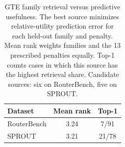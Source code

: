 \begin{table}[H]
\centering
\small
\setlength{\tabcolsep}{4pt}
\caption{GTE family retrieval versus predictive usefulness. The best source minimizes relative-utility prediction error for each held-out family and penalty. Mean rank weights families and the 13 prescribed penalties equally. Top-1 counts cases in which this source has the highest retrieval share. Candidate sources: six on RouterBench, five on SPROUT.}
\label{tab:utility-family-summary}
\begin{tabular}{@{}lcc@{}}
\toprule
Dataset & Mean rank & Top-1 \\
\midrule
RouterBench & 3.24 & 7/91 \\
SPROUT & 3.21 & 21/78 \\
\bottomrule
\end{tabular}
\end{table}
